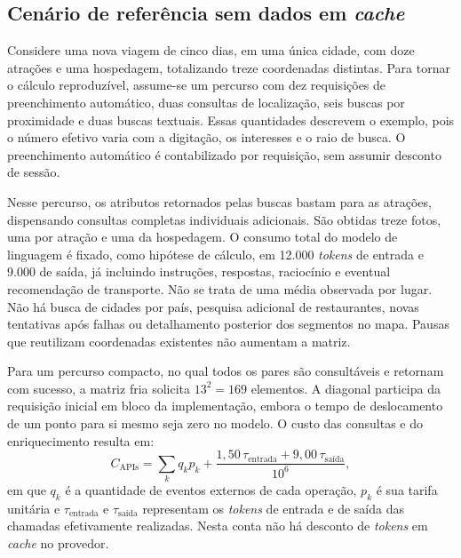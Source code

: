 \subsection{Cenário de referência sem dados em \textit{cache}}

Considere uma nova viagem de cinco dias, em uma única cidade, com doze atrações e uma hospedagem, totalizando treze coordenadas distintas. Para tornar o cálculo reproduzível, assume-se um percurso com dez requisições de preenchimento automático, duas consultas de localização, seis buscas por proximidade e duas buscas textuais. Essas quantidades descrevem o exemplo, pois o número efetivo varia com a digitação, os interesses e o raio de busca. O preenchimento automático é contabilizado por requisição, sem assumir desconto de sessão.

Nesse percurso, os atributos retornados pelas buscas bastam para as atrações, dispensando consultas completas individuais adicionais. São obtidas treze fotos, uma por atração e uma da hospedagem. O consumo total do modelo de linguagem é fixado, como hipótese de cálculo, em 12.000 \textit{tokens} de entrada e 9.000 de saída, já incluindo instruções, respostas, raciocínio e eventual recomendação de transporte. Não se trata de uma média observada por lugar. Não há busca de cidades por país, pesquisa adicional de restaurantes, novas tentativas após falhas ou detalhamento posterior dos segmentos no mapa. Pausas que reutilizam coordenadas existentes não aumentam a matriz.

Para um percurso compacto, no qual todos os pares são consultáveis e retornam com sucesso, a matriz fria solicita $13^2=169$ elementos. A diagonal participa da requisição inicial em bloco da implementação, embora o tempo de deslocamento de um ponto para si mesmo seja zero no modelo. O custo das consultas e do enriquecimento resulta em:
\[
 C_{\mathrm{APIs}} = \sum_k q_k p_k
 + \frac{1{,}50\,\tau_{\text{entrada}}+9{,}00\,\tau_{\text{saída}}}{10^6},
\]
em que $q_k$ é a quantidade de eventos externos de cada operação, $p_k$ é sua tarifa unitária e $\tau_{\text{entrada}}$ e $\tau_{\text{saída}}$ representam os \textit{tokens} de entrada e de saída das chamadas efetivamente realizadas. Nesta conta não há desconto de \textit{tokens} em \textit{cache} no provedor.


